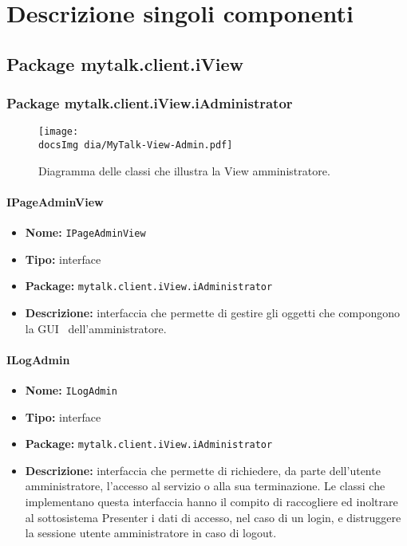 \section{Descrizione singoli componenti}
\subsection{Package mytalk.client.iView}{
\subsubsection{Package mytalk.client.iView.iAdministrator}{

	\begin{figure}[h!tbp]
		\centering
		\texttt{[image: \\docsImg dia/MyTalk-View-Admin.pdf]}
		\caption{Diagramma delle classi che illustra la View amministratore.}
	\end{figure}

\paragraph{IPageAdminView}{
	\begin{itemize}
		\item [] \textbf{Nome:} \texttt{IPageAdminView}
		\item [] \textbf{Tipo:} interface
		\item [] \textbf{Package:} \texttt{mytalk.client.iView.iAdministrator}
		\item [] \textbf{Descrizione:}{ interfaccia che permette di gestire gli oggetti che compongono la GUI\g~ dell'amministratore.}
	\end{itemize}
}
\paragraph{ILogAdmin}{
	\begin{itemize}
		\item [] \textbf{Nome:} \texttt{ILogAdmin}
		\item [] \textbf{Tipo:} interface
		\item [] \textbf{Package:} \texttt{mytalk.client.iView.iAdministrator}
		\item [] \textbf{Descrizione:}{ interfaccia che permette di richiedere, da parte dell'utente amministratore, l'accesso al servizio o alla sua terminazione. Le classi che implementano questa interfaccia hanno il compito di raccogliere ed inoltrare al sottosistema Presenter i dati di accesso, nel caso di un login, e distruggere la sessione utente amministratore in caso di logout.}
	\end{itemize}
}
}}
